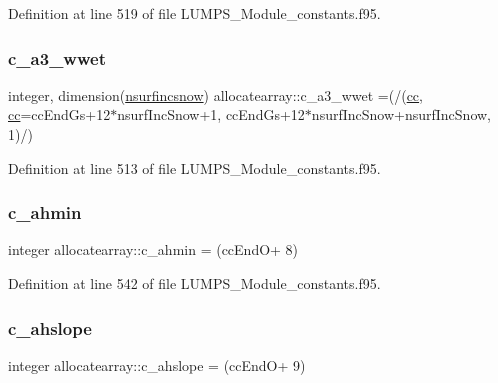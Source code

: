 Definition at line 519 of file L\+U\+M\+P\+S\+\_\+\+Module\+\_\+constants.\+f95.

\mbox{\label{namespaceallocatearray_a53b87e670c605abe2161e0fdc25f87fd}} 
\subsubsection{\texorpdfstring{c\+\_\+a3\+\_\+wwet}{c\_a3\_wwet}}
{\footnotesize\ttfamily integer, dimension(\hyperlink{namespaceallocatearray_af4d113f332b6759cfa22271140c9162d}{nsurfincsnow}) allocatearray\+::c\+\_\+a3\+\_\+wwet =(/(\hyperlink{namespaceallocatearray_ac863c81704eb507dee10f5e10741e10c}{cc}, \hyperlink{namespaceallocatearray_ac863c81704eb507dee10f5e10741e10c}{cc}=cc\+End\+Gs+12$\ast$nsurf\+Inc\+Snow+1, cc\+End\+Gs+12$\ast$nsurf\+Inc\+Snow+nsurf\+Inc\+Snow, 1)/)}



Definition at line 513 of file L\+U\+M\+P\+S\+\_\+\+Module\+\_\+constants.\+f95.

\mbox{\label{namespaceallocatearray_ae9a2fabfb3c96a65abc7658a20cc96e4}} 
\subsubsection{\texorpdfstring{c\+\_\+ahmin}{c\_ahmin}}
{\footnotesize\ttfamily integer allocatearray\+::c\+\_\+ahmin = (cc\+EndO+ 8)}



Definition at line 542 of file L\+U\+M\+P\+S\+\_\+\+Module\+\_\+constants.\+f95.

\mbox{\label{namespaceallocatearray_a7ec4c5b36ffc6e561a665ed0610bcfdc}} 
\subsubsection{\texorpdfstring{c\+\_\+ahslope}{c\_ahslope}}
{\footnotesize\ttfamily integer allocatearray\+::c\+\_\+ahslope = (cc\+EndO+ 9)}



